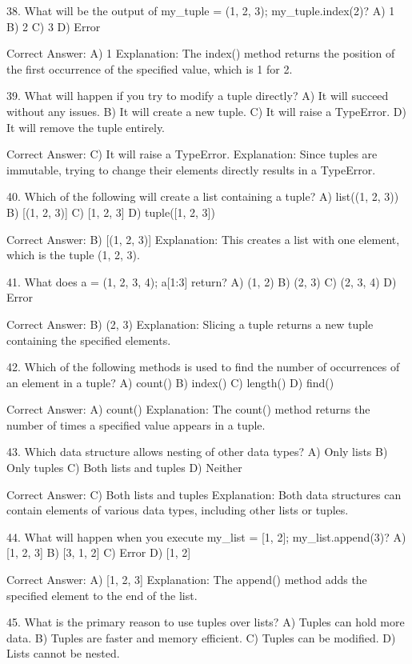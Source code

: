 38. What will be the output of my_tuple = (1, 2, 3); my_tuple.index(2)?
A) 1
B) 2
C) 3
D) Error

Correct Answer: A) 1
Explanation: The index() method returns the position of the first occurrence of the specified value, which is 1 for 2.

39. What will happen if you try to modify a tuple directly?
A) It will succeed without any issues.
B) It will create a new tuple.
C) It will raise a TypeError.
D) It will remove the tuple entirely.

Correct Answer: C) It will raise a TypeError.
Explanation: Since tuples are immutable, trying to change their elements directly results in a TypeError.

40. Which of the following will create a list containing a tuple?
A) list((1, 2, 3))
B) [(1, 2, 3)]
C) [1, 2, 3]
D) tuple([1, 2, 3])

Correct Answer: B) [(1, 2, 3)]
Explanation: This creates a list with one element, which is the tuple (1, 2, 3).

41. What does a = (1, 2, 3, 4); a[1:3] return?
A) (1, 2)
B) (2, 3)
C) (2, 3, 4)
D) Error

Correct Answer: B) (2, 3)
Explanation: Slicing a tuple returns a new tuple containing the specified elements.

42. Which of the following methods is used to find the number of occurrences of an element in a tuple?
A) count()
B) index()
C) length()
D) find()

Correct Answer: A) count()
Explanation: The count() method returns the number of times a specified value appears in a tuple.

43. Which data structure allows nesting of other data types?
A) Only lists
B) Only tuples
C) Both lists and tuples
D) Neither

Correct Answer: C) Both lists and tuples
Explanation: Both data structures can contain elements of various data types, including other lists or tuples.

44. What will happen when you execute my_list = [1, 2]; my_list.append(3)?
A) [1, 2, 3]
B) [3, 1, 2]
C) Error
D) [1, 2]

Correct Answer: A) [1, 2, 3]
Explanation: The append() method adds the specified element to the end of the list.

45. What is the primary reason to use tuples over lists?
A) Tuples can hold more data.
B) Tuples are faster and memory efficient.
C) Tuples can be modified.
D) Lists cannot be nested.


